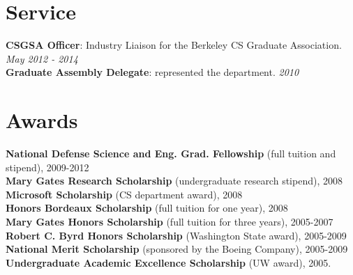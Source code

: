 \documentclass[line, margin]{res}
\begin{document}
\begin{resume}
\section{\sc Service}
{\bf CSGSA Officer}: Industry Liaison for the Berkeley CS Graduate Association. \emph{May 2012 - 2014}
\\{\bf Graduate Assembly Delegate}: represented the department. \emph{2010}

\section{\sc Awards}
{\bf National Defense Science and Eng. Grad. Fellowship} (full tuition and stipend), 2009-2012\\
{\bf Mary Gates Research Scholarship} (undergraduate research stipend), 2008\\
{\bf Microsoft Scholarship} (CS department award), 2008\\
{\bf Honors Bordeaux Scholarship} (full tuition for one year), 2008\\
{\bf Mary Gates Honors Scholarship} (full tuition for three years), 2005-2007\\
{\bf Robert C. Byrd Honors Scholarship} (Washington State award), 2005-2009\\
{\bf National Merit Scholarship} (sponsored by the Boeing Company), 2005-2009\\
{\bf Undergraduate Academic Excellence Scholarship} (UW award), 2005.


\end{resume}
\end{document}
